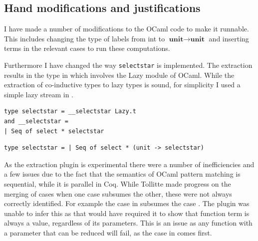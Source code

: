 \documentclass[12pt,twoside,notitlepage]{report}
\begin{document}
\subsection{Hand modifications and justifications}
I have made a number of modifications to the OCaml code to make it runnable. This includes changing the type of labels from int to $ \textbf{unit}\rightarrow\textbf{unit} $ and inserting terms in the relevant cases to run these computations. 

Furthermore I have changed the way \verb|selectstar| is implemented. The extraction results in the type in  which involves the Lazy module of OCaml. While the extraction of co-inductive types to lazy types is sound, for simplicity I used a simple lazy stream in . 


\vspace{3mm}
\begin{minipage}{\linewidth}

\begin{lstlisting}[caption={OCaml lazy selectstar}, label={lst:ocamllazystar}]
type selectstar = __selectstar Lazy.t
and __selectstar =
| Seq of select * selectstar
\end{lstlisting}

\end{minipage}

\begin{minipage}{\linewidth}

\begin{lstlisting}[caption={OCaml stream selectstar}, label={lst:ocamlstreamstar}]
type selectstar = | Seq of select * (unit -> selectstar) 
\end{lstlisting}

\end{minipage}

As the extraction plugin is experimental there were a number of inefficiencies and a few issues due to the fact that the semantics of OCaml pattern matching is sequential, while it is parallel in Coq. While Tollitte\cite{tollitte2012producing} made progress on the merging of cases when one case subsumes the other, these were not always correctly identified. For example the case  in  subsumes the case . The plugin was unable to infer this as that would have required it to show that function term is always a value, regardless of its parameters. This is an issue as any function with a parameter that can be reduced will fail, as the case in  comes first.
\end{document}
